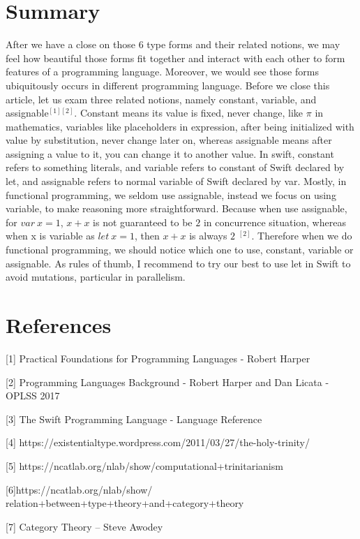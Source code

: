 \documentclass{article}
\begin{document}
\section{Summary}
After we have a close on those 6 type forms and their related notions, we may feel how beautiful those forms fit together and interact with each other to form features of a programming language. Moreover, we would see those forms ubiquitously occurs in different programming language. Before we close this article, let us exam three related notions, namely constant, variable, and assignable$^{[1][2]}$. Constant means its value is fixed, never change, like $\pi$ in mathematics, variables like placeholders in expression, after being initialized with value by substitution, never change later on, whereas assignable means after assigning a value to it, you can change it to another value. In swift, constant refers to something literals, and variable refers to constant of Swift declared by let, and assignable refers to normal variable of Swift declared by var. Mostly, in functional programming, we seldom use assignable, instead we focus on using variable, to make reasoning more straightforward. Because when use assignable, for $var\ x = 1$, $x + x$ is not guaranteed to be $2$ in concurrence situation, whereas when x is variable as $let\ x = 1$, then $x + x$ is always $2$ $^{[2]}$. Therefore when we do functional programming, we should notice which one to use, constant, variable or assignable. As rules of thumb, I recommend to try our best to use let in Swift to avoid mutations, particular in parallelism.

\section{References}
[1] Practical Foundations for Programming Languages - Robert Harper

[2] Programming Languages Background - Robert Harper and Dan Licata - OPLSS 2017

[3] The Swift Programming Language - Language Reference

[4] https://existentialtype.wordpress.com/2011/03/27/the-holy-trinity/

[5] https://ncatlab.org/nlab/show/computational+trinitarianism

[6]https://ncatlab.org/nlab/show/\\ relation+between+type+theory+and+category+theory

[7] Category Theory -- Steve Awodey
\end{document}
